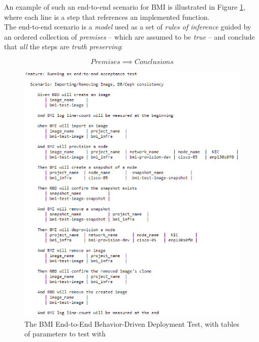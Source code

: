 An example of such an end-to-end scenario for BMI is illustrated in Figure \ref{fig:chp1_bdd-bmi-end-to-end-template}, where each line is a step that references an implemented function. \\

The end-to-end scenario is a \emph{model} used as a set of \emph{rules of inference} guided by an ordered collection of \emph{premises} -- which are assumed to be \emph{true} -- and conclude that \emph{all} the steps are \emph{truth preserving}:

\begin{center}
$$Premises \implies Conclusions$$
\end{center}

\pagebreak

\begin{figure}[!h] %
\begin{center}
\includegraphics[scale=1]{figures/end-to-end-bdd-template.png}
\end{center}
\caption{The BMI End-to-End Behavior-Driven Deployment Test, with tables of parameters to test with}
\label{fig:chp1_bdd-bmi-end-to-end-template}
\end{figure}





